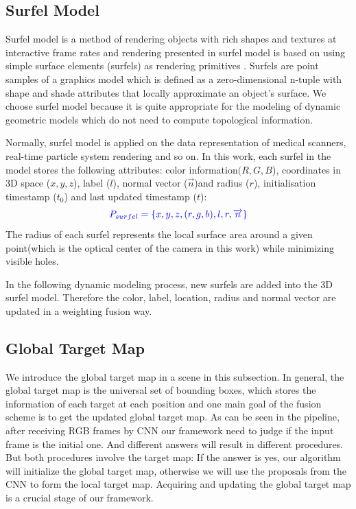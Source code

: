 \documentclass[conference]{IEEEtran}
\begin{document}
{\color{blue}\subsection{\textbf{Surfel Model}}
	
Surfel model is a method of rendering objects with rich shapes and textures at interactive frame rates and rendering presented in surfel model is based on using simple surface elements (surfels) as rendering primitives \cite{Pfister2000} . Surfels are point samples of a graphics model which is defined as a zero-dimensional n-tuple with shape and shade attributes that locally approximate an object’s surface. We choose surfel model because it is quite appropriate for the modeling of dynamic geometric models which do not need to compute topological information. 

Normally, surfel model is applied on the data representation of medical scanners, real-time particle system rendering and so on. In this work, each surfel in the model stores the following attributes: color information$(R,G,B$), coordinates in 3D space ($x,y,z$), label ($l$), normal vector ($\overrightarrow{n}$)and radius ($r$), initialisation timestamp ($t_{0}$) and last updated timestamp ($t$): 
\begin{equation}
\color{blue}
P_{surfel}=\{x, y, z, (r,g,b), l, r, \overrightarrow{n}\}
\end{equation}
The radius of each surfel represents the local surface area around a given point(which is the optical center of the camera in this work) while minimizing visible holes. 

In the following dynamic modeling process, new surfels are added into the 3D surfel model. Therefore the color, label, location, radius and normal vector are updated in a  weighting fusion way.
}


\subsection{\textbf{Global Target Map}}

We introduce the global target map  in a scene in this subsection. In general, the global target map is the universal set of bounding boxes, which stores the information of each target at each position and one main goal of the fusion scheme is to get the updated  global target map.  As can be seen in the pipeline, after receiving RGB frames by CNN our framework need to judge if the input frame is the initial one. And different answers will result in different procedures. But both procedures involve the target map: If the answer is yes, our algorithm will initialize the global target map, otherwise we will use the proposals from the CNN to form the local target map. Acquiring and updating the global target map is a crucial stage of our framework. 
\end{document}

